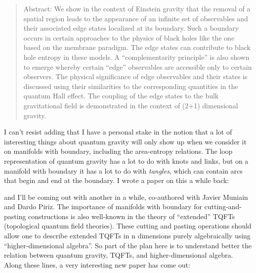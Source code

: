 \documentclass[12pt]{article}
\def\tightlist{}
\renewcommand{\texttt}[1]{%
  \begingroup
  \ttfamily
  \begingroup\lccode`~=`/\lowercase{\endgroup\def~}{/\discretionary{}{}{}}%
  \begingroup\lccode`~=`[\lowercase{\endgroup\def~}{[\discretionary{}{}{}}%
  \begingroup\lccode`~=`.\lowercase{\endgroup\def~}{.\discretionary{}{}{}}%
  \catcode`/=\active\catcode`[=\active\catcode`.=\active
  \scantokens{#1\noexpand}%
  \endgroup
}
\begin{document}
\begin{quote}
Abstract: We show in the context of Einstein gravity that the removal of
a spatial region leads to the appearance of an infinite set of
observables and their associated edge states localized at its boundary.
Such a boundary occurs in certain approaches to the physics of black
holes like the one based on the membrane paradigm. The edge states can
contribute to black hole entropy in these models. A ``complementarity
principle'' is also shown to emerge whereby certain ``edge'' observables
are accessible only to certain observers. The physical significance of
edge observables and their states is discussed using their similarities
to the corresponding quantities in the quantum Hall effect. The coupling
of the edge states to the bulk gravitational field is demonstrated in
the context of (2+1) dimensional gravity.
\end{quote}

I can't resist adding that I have a personal stake in the notion that a
lot of interesting things about quantum gravity will only show up when
we consider it on manifolds with boundary, including the area-entropy
relations. The loop representation of quantum gravity has a lot to do
with knots and links, but on a manifold with boundary it has a lot to do
with \emph{tangles}, which can contain arcs that begin and end at the
boundary. I wrote a paper on this a while back:


and I'll be coming out with another in a while, co-authored with Javier
Muniain and Dardo Piriz. The importance of manifolds with boundary for
cutting-and-pasting constructions is also well-known in the theory of
``extended'' TQFTs (topological quantum field theories). These cutting
and pasting operations should allow one to describe extended TQFTs in n
dimensions purely algebraically using ``higher-dimensional algebra''. So
part of the plan here is to understand better the relation between
quantum gravity, TQFTs, and higher-dimensional algebra. Along these
lines, a very interesting new paper has come out:
\end{document}
